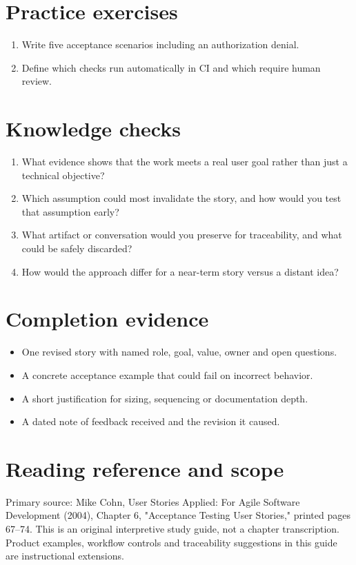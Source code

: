 \documentclass[11pt,letterpaper]{article}
\begin{document}
\section{Practice exercises}
\begin{enumerate}[leftmargin=*,itemsep=3pt]
\item Write five acceptance scenarios including an authorization denial.
\item Define which checks run automatically in CI and which require human review.
\end{enumerate}
\section{Knowledge checks}
\begin{enumerate}[leftmargin=*,itemsep=3pt]
\item What evidence shows that the work meets a real user goal rather than just a technical objective?
\item Which assumption could most invalidate the story, and how would you test that assumption early?
\item What artifact or conversation would you preserve for traceability, and what could be safely discarded?
\item How would the approach differ for a near-term story versus a distant idea?
\end{enumerate}
\section{Completion evidence}
\begin{itemize}[leftmargin=*,itemsep=2pt]
\item One revised story with named role, goal, value, owner and open questions.
\item A concrete acceptance example that could fail on incorrect behavior.
\item A short justification for sizing, sequencing or documentation depth.
\item A dated note of feedback received and the revision it caused.
\end{itemize}
\section{Reading reference and scope}
Primary source: Mike Cohn, User Stories Applied: For Agile Software Development (2004), Chapter 6, "Acceptance Testing User Stories," printed pages 67–74. This is an original interpretive study guide, not a chapter transcription. Product examples, workflow controls and traceability suggestions in this guide are instructional extensions.
\end{document}
